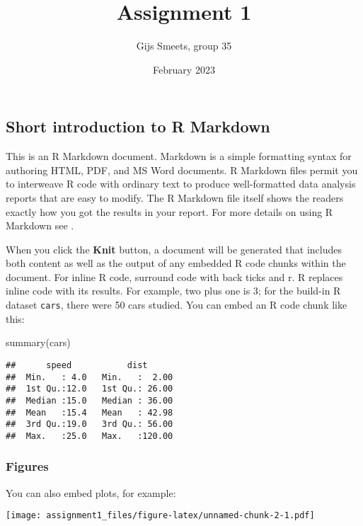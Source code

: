 \documentclass[
  11pt,
]{article}
\title{Assignment 1}
\author{Gijs Smeets, group 35}
\date{February 2023}
\newenvironment{Shaded}{\begin{snugshade}}{\end{snugshade}}
\newcommand{\FunctionTok}[1]{\textcolor[rgb]{0.00,0.00,0.00}{#1}}
\newcommand{\NormalTok}[1]{#1}
\begin{document}
\maketitle

\hypertarget{short-introduction-to-r-markdown}{%
\subsection{Short introduction to R
Markdown}\label{short-introduction-to-r-markdown}}

This is an R Markdown document. Markdown is a simple formatting syntax
for authoring HTML, PDF, and MS Word documents. R Markdown files permit
you to interweave R code with ordinary text to produce well-formatted
data analysis reports that are easy to modify. The R Markdown file
itself shows the readers exactly how you got the results in your report.
For more details on using R Markdown see
\href{http://rmarkdown.rstudio.com}{}.

When you click the \textbf{Knit} button, a document will be generated
that includes both content as well as the output of any embedded R code
chunks within the document. For inline R code, surround code with back
ticks and r. R replaces inline code with its results. For example, two
plus one is 3; for the build-in R dataset \texttt{cars}, there were 50
cars studied. You can embed an R code chunk like this:

\begin{Shaded}
\begin{Highlighting}[]
\FunctionTok{summary}\NormalTok{(cars)}
\end{Highlighting}
\end{Shaded}

\begin{verbatim}
##      speed           dist       
##  Min.   : 4.0   Min.   :  2.00  
##  1st Qu.:12.0   1st Qu.: 26.00  
##  Median :15.0   Median : 36.00  
##  Mean   :15.4   Mean   : 42.98  
##  3rd Qu.:19.0   3rd Qu.: 56.00  
##  Max.   :25.0   Max.   :120.00
\end{verbatim}

\hypertarget{figures}{%
\subsubsection{Figures}\label{figures}}

You can also embed plots, for example:

\texttt{[image: assignment1\_files/figure-latex/unnamed-chunk-2-1.pdf]}
\end{document}
